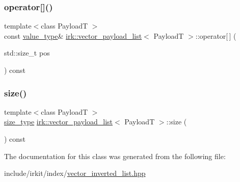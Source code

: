\mbox{\label{classirk_1_1vector__payload__list_ae7225b27a6d4e7b3f14122c99497ebfa}} 
\subsubsection{\texorpdfstring{operator[]()}{operator[]()}}
{\footnotesize\ttfamily template$<$class PayloadT $>$ \\
const \mbox{\hyperlink{classirk_1_1vector__payload__list_acded07bf18f4c147495e0b0dfdbf8922}{value\+\_\+type}}\& \mbox{\hyperlink{classirk_1_1vector__payload__list}{irk\+::vector\+\_\+payload\+\_\+list}}$<$ PayloadT $>$\+::operator\mbox{[}$\,$\mbox{]} (\begin{DoxyParamCaption}\item[{std\+::size\+\_\+t}]{pos }\end{DoxyParamCaption}) const\hspace{0.3cm}{\ttfamily [inline]}}

\mbox{\label{classirk_1_1vector__payload__list_ac3adf5af4d6301de780af1a1621a2084}} 
\subsubsection{\texorpdfstring{size()}{size()}}
{\footnotesize\ttfamily template$<$class PayloadT $>$ \\
\mbox{\hyperlink{classirk_1_1vector__payload__list_a319d51342d589c056943998b362120ca}{size\+\_\+type}} \mbox{\hyperlink{classirk_1_1vector__payload__list}{irk\+::vector\+\_\+payload\+\_\+list}}$<$ PayloadT $>$\+::size (\begin{DoxyParamCaption}{ }\end{DoxyParamCaption}) const\hspace{0.3cm}{\ttfamily [inline]}}



The documentation for this class was generated from the following file\+:\begin{DoxyCompactItemize}
\item 
include/irkit/index/\mbox{\hyperlink{vector__inverted__list_8hpp}{vector\+\_\+inverted\+\_\+list.\+hpp}}\end{DoxyCompactItemize}
